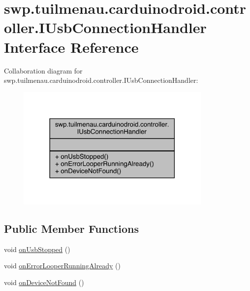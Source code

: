 \hypertarget{interfaceswp_1_1tuilmenau_1_1carduinodroid_1_1controller_1_1_i_usb_connection_handler}{}\section{swp.\+tuilmenau.\+carduinodroid.\+controller.\+I\+Usb\+Connection\+Handler Interface Reference}
\label{interfaceswp_1_1tuilmenau_1_1carduinodroid_1_1controller_1_1_i_usb_connection_handler}


Collaboration diagram for swp.\+tuilmenau.\+carduinodroid.\+controller.\+I\+Usb\+Connection\+Handler\+:
\nopagebreak
\begin{figure}[H]
\begin{center}
\leavevmode
\includegraphics[width=270pt]{interfaceswp_1_1tuilmenau_1_1carduinodroid_1_1controller_1_1_i_usb_connection_handler__coll__graph}
\end{center}
\end{figure}
\subsection*{Public Member Functions}
\begin{DoxyCompactItemize}
\item 
void \hyperlink{interfaceswp_1_1tuilmenau_1_1carduinodroid_1_1controller_1_1_i_usb_connection_handler_a1bb25ee474b0c65e5cac68f504e3322b}{on\+Usb\+Stopped} ()
\item 
void \hyperlink{interfaceswp_1_1tuilmenau_1_1carduinodroid_1_1controller_1_1_i_usb_connection_handler_afcaf80567470dce1b025832862b5193a}{on\+Error\+Looper\+Running\+Already} ()
\item 
void \hyperlink{interfaceswp_1_1tuilmenau_1_1carduinodroid_1_1controller_1_1_i_usb_connection_handler_a28256f61b093f0a19946f5f822861225}{on\+Device\+Not\+Found} ()
\end{DoxyCompactItemize}


